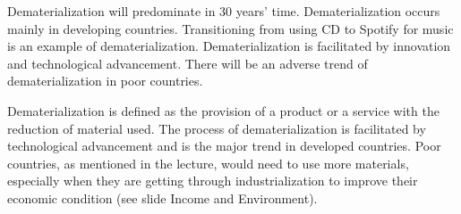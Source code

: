 \begin{parts}
    \begin{choices}
        \choice Dematerialization will predominate in 30 years' time.
        \correctchoice Dematerialization occurs mainly in developing countries.
        \choice Transitioning from using CD to Spotify for music is an example of dematerialization.
        \choice Dematerialization is facilitated by innovation and technological advancement.
        \choice There will be an adverse trend of dematerialization in poor countries.
    \end{choices}

    \begin{solution}
        Dematerialization is defined as the provision of a product or a service with the
        reduction of material used. The process of dematerialization is facilitated by technological
        advancement and is the major trend in developed countries. Poor countries, as mentioned in the
        lecture, would need to use more materials, especially when they are getting through industrialization
        to improve their economic condition (see slide Income and Environment).
    \end{solution}

\end{parts}